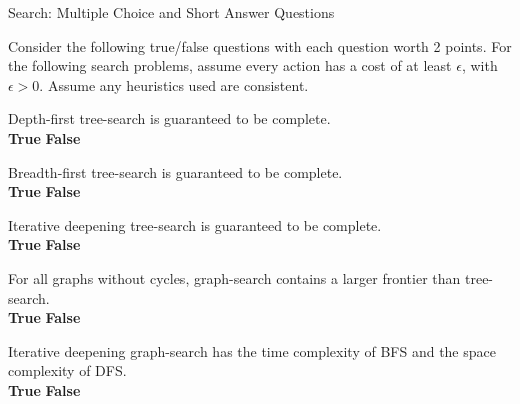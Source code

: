 \begin{problem}{Search: Multiple Choice and Short Answer Questions}

\begin{question}[12]
Consider the following true/false questions with each question worth 2 points. For the following search problems, assume every action has a cost of at least $\epsilon$, with $\epsilon > 0$.  Assume any heuristics used are consistent. 

\vspace{2mm}
\hspace{0.5mm}
Depth-first tree-search is guaranteed to be complete. \\
\solution{\emptycircle}{\FourAATrue} \textbf{True}
\hspace{5mm}
\solution{\emptycircle}{\FourAAFalse} \textbf{False} \\
\solution{}{\FourAAReason}

\vspace{2mm}
\hspace{0.5mm}
Breadth-first tree-search is guaranteed to be complete. \\
\solution{\emptycircle}{\FourABTrue} \textbf{True}
\hspace{5mm}
\solution{\emptycircle}{\FourABFalse} \textbf{False} \\
\solution{}{\FourABReason}

\vspace{2mm}
\hspace{0.5mm}
Iterative deepening tree-search is guaranteed to be complete. \\
\solution{\emptycircle}{\FourACTrue} \textbf{True}
\hspace{5mm}
\solution{\emptycircle}{\FourACFalse} \textbf{False} \\
\solution{}{\FourACReason}

\vspace{2mm}
\hspace{0.5mm}
For all graphs without cycles, graph-search contains a larger frontier than tree-search. \\
\solution{\emptycircle}{\FourADTrue} \textbf{True}
\hspace{5mm}
\solution{\emptycircle}{\FourADFalse} \textbf{False} \\
\solution{}{\FourADReason}

\vspace{2mm}
\hspace{0.5mm}
Iterative deepening graph-search has the time complexity of BFS and the space complexity of DFS. \\
\solution{\emptycircle}{\FourAETrue} \textbf{True}
\hspace{5mm}
\solution{\emptycircle}{\FourAEFalse} \textbf{False} \\
\solution{}{\FourAEReason}


\end{question}
\end{problem}
